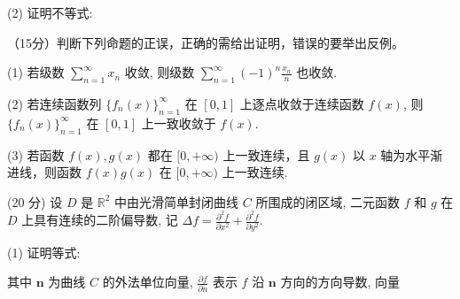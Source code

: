\par{}
(2) 证明不等式:\par
\nopagebreak[4]
\par{}
（15分）判断下列命题的正误，正确的需给出证明，错误的要举出反例。\par
(1) 若级数 $\sum_{n=1}^{\infty} x_n$ 收敛, 则级数 $\sum_{n=1}^{\infty} (-1)^n \frac{x_n}{n}$ 也收敛.\par
(2) 若连续函数列 $\{f_n(x)\}_{n=1}^{\infty}$ 在 $[0,1]$ 上逐点收敛于连续函数 $f(x)$, 则 $\{f_n(x)\}_{n=1}^{\infty}$ 在 $[0,1]$ 上一致收敛于 $f(x)$.\par
(3) 若函数 $f(x), g(x)$ 都在 $[0, +\infty)$ 上一致连续，且 $g(x)$ 以 $x$ 轴为水平渐进线，则函数 $f(x)g(x)$ 在 $[0, +\infty)$ 上一致连续.\par
\par{}
(20 分) 设 $D$ 是 $\mathbb{R}^2$ 中由光滑简单封闭曲线 $C$ 所围成的闭区域, 二元函数 $f$ 和 $g$ 在 $D$ 上具有连续的二阶偏导数, 记 $\Delta f = \frac{\partial^2 f}{\partial x^2} + \frac{\partial^2 f}{\partial y^2}$.\par
\par{}
(1) 证明等式:\par
\nopagebreak[4]
\par{}
其中 $\pmb{n}$ 为曲线 $C$ 的外法单位向量, $\frac{\partial f}{\partial n}$ 表示 $f$ 沿 $\pmb{n}$ 方向的方向导数, 向量\par
